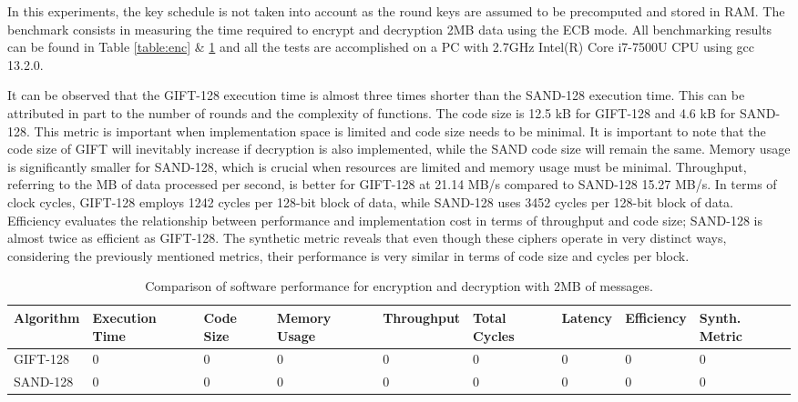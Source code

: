 \documentclass[conference]{IEEEtran}
\begin{document}
In this experiments, the key schedule is not taken into account as the round keys are assumed to be precomputed and stored in RAM. The benchmark consists in measuring the time required to encrypt and decryption 2MB data using the ECB mode. All benchmarking results can be found in Table \ref{table:enc} \& \ref{table:dec} and all the tests are accomplished on a PC with 2.7GHz Intel(R) Core i7-7500U CPU using gcc 13.2.0.  

It can be observed that the GIFT-128 execution time is almost three times shorter than the SAND-128 execution time. This can be attributed in part to the number of rounds and the complexity of functions. The code size is 12.5 kB for GIFT-128 and 4.6 kB for SAND-128. This metric is important when implementation space is limited and code size needs to be minimal. It is important to note that the code size of GIFT will inevitably increase if decryption is also implemented, while the SAND code size will remain the same. Memory usage is significantly smaller for SAND-128, which is crucial when resources are limited and memory usage must be minimal. Throughput, referring to the MB of data processed per second, is better for GIFT-128 at 21.14 MB/s compared to SAND-128 15.27 MB/s. In terms of clock cycles, GIFT-128 employs 1242 cycles per 128-bit block of data, while SAND-128 uses 3452 cycles per 128-bit block of data. Efficiency evaluates the relationship between performance and implementation cost in terms of throughput and code size; SAND-128 is almost twice as efficient as GIFT-128. The synthetic metric reveals that even though these ciphers operate in very distinct ways, considering the previously mentioned metrics, their performance is very similar in terms of code size and cycles per block.

\begin{table}[ht]
  \centering
  \caption{Comparison of software performance for encryption and decryption with 2MB of messages.}
  \begin{tabular}{lllllllll} 
   \toprule
   Algorithm & Execution Time & Code Size & Memory Usage & Throughput & Total Cycles & Latency & Efficiency & Synth. Metric\\ 
   \midrule
   GIFT-128 & 0 & 0 & 0 & 0 & 0 & 0 & 0 & 0 \\
   SAND-128 & 0 & 0 & 0 & 0 & 0 & 0 & 0 & 0  \\
   \bottomrule
  \end{tabular}
  \label{table:dec}
\end{table}
\end{document}
